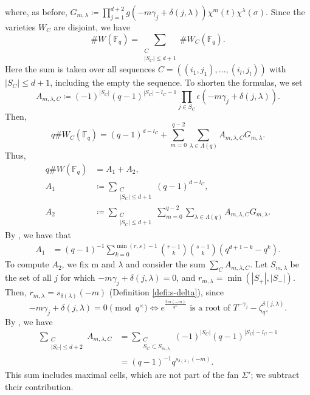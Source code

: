 \documentclass[11pt, reqno]{amsart}
\theoremstyle{plain}
\theoremstyle{definition}
\newcommand{\F}{\mathbb{F}}
\begin{document}
where, as before, $ G_{m,\lambda}\coloneqq \prod_{j=1}^{d+2}g\left(-m\gamma_j + \delta(j,\lambda)\right) \chi^{m}(t) \chi^{\lambda}(\sigma)$.
Since the varieties $W_C$ are disjoint, we have
\begin{equation}
    \#W(\F_q) = \sum_{ \substack{C \\ |S_C| \le d+1}}  \#W_C(\F_q).
\end{equation}
Here the sum is taken over all sequences  $C= ((i_1,j_1),\dots ,(i_l,j_l))$ with $|S_C| \le d+1$, including the empty the sequence.
To shorten the formulas, we set
\[
A_{m,\lambda,C}\coloneqq (-1)^{|S_C|}(q-1)^{|S_C|-l_C-1}
  \prod_{j\in S_C}\epsilon\left( -m \gamma_j +\delta(j,\lambda) \right).
\]
Then,
\[
q\#W_C(\F_q) = (q-1)^{d-l_C} + \sum_{m=0}^{q-2} \sum_{\lambda \in \Lambda(q)} A_{m,\lambda,C} G_{m,\lambda}.
\]
Thus,
\begin{align*}
    q \# W(\F_q) &= A_1 + A_2, \\
    A_1 &\coloneqq \sum_{ \substack{C \\ |S_C| \le d+1}} (q-1)^{d-l_C},  \\
    A_2 &\coloneqq \sum_{ \substack{C \\ |S_C| \le d+1}}\sum_{m=0}^{q-2} \sum_{\lambda \in \Lambda(q)} A_{m,\lambda,C} G_{m,\lambda}. 
\end{align*}
By \cite[Proposition 5.6 and 5.7]{BCM}, we have that 
\begin{align}
    A_1 &=  (q-1)^{-1} \sum_{k=0}^{\min{(r,s)-1}} {\binom{r-1}{k}}{\binom{s-1}{k}} \left( q^{d+1-k} - q^{k} \right).
\end{align}
To compute $A_2$, 
we fix m and $\lambda$ and consider the sum $\sum_C A_{m,\lambda,C}$.
Let $S_{m,\lambda}$  be the set of all $j$ for which  $-m \gamma_j +\delta(j, \lambda)=0$,    and  $r_{m,\lambda} = \min(|S_+|, |S_-|)$. Then, $r_{m,\lambda} =s_{\delta(\lambda)} (-m)$ (Definition \ref{defi:s-delta}), since
\[ -m \gamma_j +\delta(j, \lambda) =0 \pmod{q^\times} \iff  e^{\frac{2 \pi i (-m)}{q^\times }} \text{ is a root of } T^{-\gamma_j}-  \zeta_{q^\times}^{\delta(j, \lambda) }.\]
By \cite[Proposition 5.5]{BCM}, we have
\begin{align*}
\sum_{ \substack{C \\ |S_C| \le d+2}} A_{m,\lambda,C}& = \sum_{ \substack{C \\ S_C \subset S_{m,\lambda}}} (-1)^{|S_C|}(q-1)^{|S_C|-l_C-1} \\
&=(q-1)^{-1} q^{s_{\delta(\lambda)} (-m)}.
\end{align*}
This sum includes maximal cells, which are not part of the fan $\Sigma'$; we subtract their contribution. 
\end{document}
